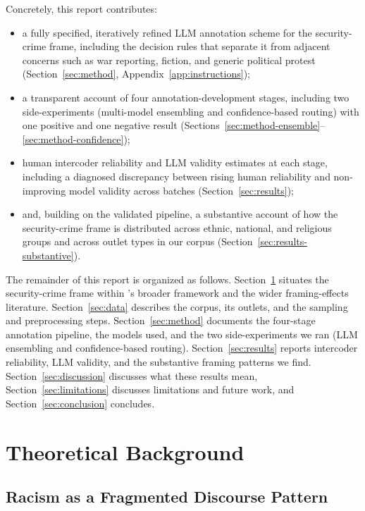 \documentclass[a4paper,oneside,bibliography=totoc]{scrartcl}
\begin{document}
Concretely, this report contributes:
\begin{itemize}[noitemsep]
    \item a fully specified, iteratively refined LLM annotation scheme for the security-crime frame, including the decision rules that separate it from adjacent concerns such as war reporting, fiction, and generic political protest (Section~\ref{sec:method}, Appendix~\ref{app:instructions});
    \item a transparent account of four annotation-development stages, including two side-experiments (multi-model ensembling and confidence-based routing) with one positive and one negative result (Sections~\ref{sec:method-ensemble}--\ref{sec:method-confidence});
    \item human intercoder reliability and LLM validity estimates at each stage, including a diagnosed discrepancy between rising human reliability and non-improving model validity across batches (Section~\ref{sec:results});
    \item and, building on the validated pipeline, a substantive account of how the security-crime frame is distributed across ethnic, national, and religious groups and across outlet types in our corpus (Section~\ref{sec:results-substantive}).
\end{itemize}

The remainder of this report is organized as follows. Section~\ref{sec:theory} situates the security-crime frame within \citet{freudenthaler2025}'s broader framework and the wider framing-effects literature. Section~\ref{sec:data} describes the corpus, its outlets, and the sampling and preprocessing steps. Section~\ref{sec:method} documents the four-stage annotation pipeline, the models used, and the two side-experiments we ran (LLM ensembling and confidence-based routing). Section~\ref{sec:results} reports intercoder reliability, LLM validity, and the substantive framing patterns we find. Section~\ref{sec:discussion} discusses what these results mean, Section~\ref{sec:limitations} discusses limitations and future work, and Section~\ref{sec:conclusion} concludes.

\section{Theoretical Background}
\label{sec:theory}

\subsection{Racism as a Fragmented Discourse Pattern}
\end{document}
